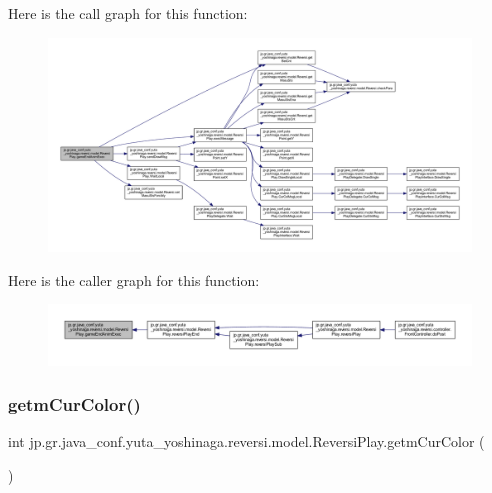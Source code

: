 Here is the call graph for this function\+:
\nopagebreak
\begin{figure}[H]
\begin{center}
\leavevmode
\includegraphics[width=350pt]{classjp_1_1gr_1_1java__conf_1_1yuta__yoshinaga_1_1reversi_1_1model_1_1_reversi_play_aaf0f07bdc219b6d8ec5551457fb551ab_cgraph}
\end{center}
\end{figure}
Here is the caller graph for this function\+:
\nopagebreak
\begin{figure}[H]
\begin{center}
\leavevmode
\includegraphics[width=350pt]{classjp_1_1gr_1_1java__conf_1_1yuta__yoshinaga_1_1reversi_1_1model_1_1_reversi_play_aaf0f07bdc219b6d8ec5551457fb551ab_icgraph}
\end{center}
\end{figure}
\mbox{\label{classjp_1_1gr_1_1java__conf_1_1yuta__yoshinaga_1_1reversi_1_1model_1_1_reversi_play_a6469b82ef6888bc98e537ce3680f95da}} 
\subsubsection{\texorpdfstring{getm\+Cur\+Color()}{getmCurColor()}}
{\footnotesize\ttfamily int jp.\+gr.\+java\+\_\+conf.\+yuta\+\_\+yoshinaga.\+reversi.\+model.\+Reversi\+Play.\+getm\+Cur\+Color (\begin{DoxyParamCaption}{ }\end{DoxyParamCaption})}



